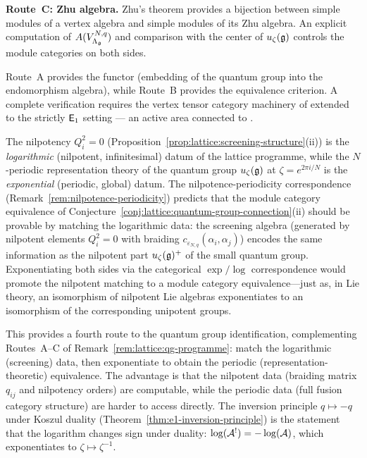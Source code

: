 \begin{remark}
\smallskip
\noindent\textbf{Route~C\textup{:} Zhu algebra.}
Zhu's theorem provides a bijection between simple modules of a
vertex algebra and simple modules of its Zhu algebra.
An explicit computation of
$A(V_{\Lambda_{\mathfrak{g}}}^{N,q})$ and comparison with the center
of $u_\zeta(\mathfrak{g})$ controls the module categories on both sides.

\smallskip
Route~A provides the functor (embedding of the quantum group
into the endomorphism algebra), while Route~B provides the
equivalence criterion.  A complete verification requires the
vertex tensor category machinery of \cite{HLZ} extended to the
strictly $\mathsf{E}_1$ setting --- an active area connected to
\cite{CreutzigGainutdinovRunkel20,Lentner17}.
\end{remark}

\begin{remark}
\label{rem:screening-nilpotence-periodicity}
The nilpotency $Q_i^2 = 0$
(Proposition~\ref{prop:lattice:screening-structure}(ii)) is the
\emph{logarithmic} (nilpotent, infinitesimal) datum of the lattice
programme, while the $N$-periodic representation theory of the quantum
group $u_\zeta(\mathfrak{g})$ at $\zeta = e^{2\pi i/N}$ is the
\emph{exponential} (periodic, global) datum.  The
nilpotence-periodicity correspondence
(Remark~\ref{rem:nilpotence-periodicity}) predicts that the module
category equivalence of
Conjecture~\ref{conj:lattice:quantum-group-connection}(ii)
should be provable by matching the logarithmic data: the screening
algebra (generated by nilpotent elements $Q_i^2 = 0$ with braiding
$c_{\varepsilon_{N,q}}(\alpha_i,\alpha_j)$) encodes the same
information as the nilpotent part $u_\zeta(\mathfrak{g})^+$ of the small quantum
group.  Exponentiating both sides via the categorical $\exp/\log$
correspondence would promote the nilpotent matching to a module
category equivalence---just as, in Lie theory, an isomorphism of
nilpotent Lie algebras exponentiates to an isomorphism of the
corresponding unipotent groups.

This provides a fourth route to the quantum group identification,
complementing Routes~A--C of
Remark~\ref{rem:lattice:qg-programme}: match the logarithmic
(screening) data, then exponentiate to obtain the periodic
(representation-theoretic) equivalence.  The advantage is that
the nilpotent data (braiding matrix $q_{ij}$ and nilpotency orders)
are computable, while the periodic data (full fusion category
structure) are harder to access directly.  The inversion principle
$q \mapsto -q$ under Koszul duality
(Theorem~\ref{thm:e1-inversion-principle}) is the statement that
the logarithm changes sign under duality: $\log(\mathcal{A}^!) = -\log(\mathcal{A})$,
which exponentiates to $\zeta \mapsto \zeta^{-1}$.
\end{remark}

